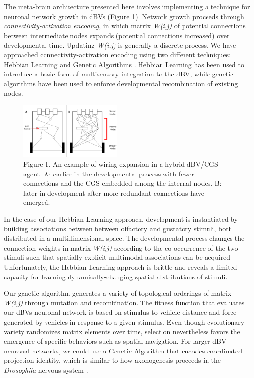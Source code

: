 \documentclass[letterpaper]{article}
\begin{document}
The meta-brain architecture presented here involves implementing a technique for neuronal network growth in dBVs (Figure 1). Network growth proceeds through \textit{connectivity-activation encoding}, in which matrix \textit{W(i,j)} of potential connections between intermediate nodes expands (potential connections increased) over developmental time. Updating \textit{W(i,j)} is generally a discrete process. We have approached connectivity-activation encoding using two different techniques: Hebbian Learning and Genetic Algorithms \citep{[9]}. Hebbian Learning has been used to introduce a basic form of multisensory integration to the dBV, while genetic algorithms have been used to enforce developmental recombination of existing nodes.

\begin{figure}[!htb]
\begin{center}
\includegraphics[width=2in]{Figure 1.png}
\caption{Figure 1. An example of wiring expansion in a hybrid dBV/CGS agent. A: earlier in the developmental process with fewer connections and the CGS embedded among the internal nodes. B: later in development after more redundant connections have emerged.}
\label{fig1}
\end{center}
\end{figure}

In the case of our Hebbian Learning approach, development is instantiated by building associations between between olfactory and gustatory stimuli, both distributed in a multidimensional space. The developmental process changes the connection weights in matrix \textit{W(i,j)} according to the co-occurrence of the two stimuli such that spatially-explicit multimodal associations can be acquired. Unfortunately, the Hebbian Learning approach is brittle and reveals a limited capacity for learning dynamically-changing spatial distributions of stimuli.

Our genetic algorithm generates a variety of topological orderings of matrix \textit{W(i,j)} through mutation and recombination. The fitness function that evaluates our dBVs neuronal network is based on stimulus-to-vehicle distance and force generated by vehicles in response to a given stimulus. Even though evolutionary variety randomizes matrix elements over time, selection nevertheless favors the emergence of specific behaviors such as spatial navigation. For larger dBV neuronal networks, we could use a Genetic Algorithm that encodes coordinated projection identity, which is similar to how axonogenesis proceeds in the \textit{Drosophila} nervous system \citep{[10]}.
\end{document}
